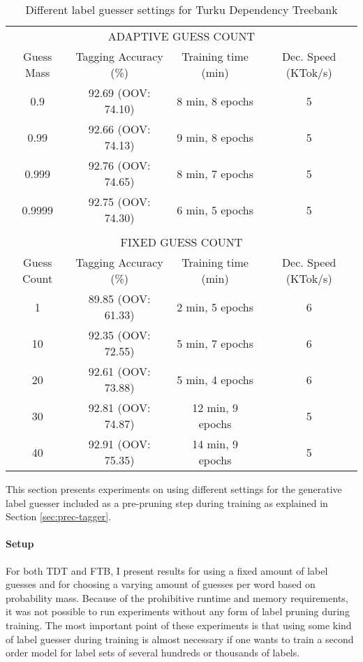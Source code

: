 \begin{table}[htb!]
\begin{center}
\begin{tabular}{c|c|c|c}
\multicolumn{4}{c}{{\small\uppercase{Adaptive Guess Count}}}\\
\noalign{\smallskip}
\hline
Guess Mass & Tagging Accuracy (\%) & Training time (min) & Dec. Speed (KTok/s)\\
\hline
0.9\phantom{999}        & 92.69 (OOV: 74.10)           & 8 min, 8 epochs           & 5            \\
0.99\phantom{99}       & 92.66 (OOV: 74.13)           & 9 min, 8 epochs           & 5            \\
0.999\phantom{9}      & 92.76 (OOV: 74.65)           & 8 min, 7 epochs            & 5            \\
0.9999      & 92.75 (OOV: 74.30)           & 6 min, 5 epochs            & 5            \\
\multicolumn{4}{c}{ }\\%
\multicolumn{4}{c}{{\small\uppercase{Fixed Guess Count}}}\\
\noalign{\smallskip}
\hline
Guess Count & Tagging Accuracy (\%) & Training time (min) & Dec. Speed (KTok/s) \\
\hline
1\phantom{0}        & 89.85  (OOV: 61.33)          & 2 min, 5 epochs            & 6            \\
10       & 92.35  (OOV: 72.55)          & 5 min, 7 epochs            & 6            \\
20       & 92.61  (OOV: 73.88)          & 5 min, 4 epochs            & 6            \\
30       & 92.81  (OOV: 74.87)          & 12 min, 9 epochs          & 5            \\
40       & 92.91  (OOV: 75.35)          & 14 min, 9 epochs            & 5            \\
\end{tabular}
\caption{Different label guesser settings for Turku Dependency Treebank}\label{tab:prune-res}
\end{center}
\end{table}

This section presents experiments on using different settings for the
generative label guesser included as a pre-pruning step during
training as explained in Section \ref{sec:prec-tagger}.

\paragraph{Setup}For both TDT and FTB, I present results for using a fixed amount of
label guesses and for choosing a varying amount of guesses per word
based on probability mass. Because of the prohibitive runtime and
memory requirements, it was not possible to run experiments without
any form of label pruning during training. The most important point of
these experiments is that using some kind of label guesser during
training is almost necessary if one wants to train a second order
model for label sets of several hundreds or thousands of labels.

